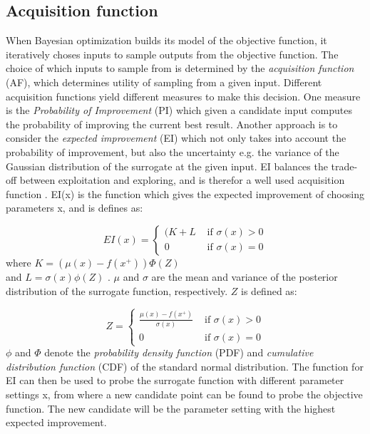 \subsection{Acquisition function}\label{sec:acquisition-function}
When Bayesian optimization builds its model of the objective function, it iteratively choses inputs to sample outputs from the objective function. The choice of which inputs to sample from is determined by the \emph{acquisition function} (AF), which determines utility of sampling from a given input. Different acquisition functions yield different measures to make this decision. One measure is the \emph{Probability of Improvement} (PI) which given a candidate input computes the probability of improving the current best result.  Another approach is to consider the \emph{expected improvement} (EI) which not only takes into account the probability of improvement, but also the uncertainty e.g. the variance of the Gaussian distribution of the surrogate at the given input.
EI balances the trade-off between exploitation and exploring, and is therefor a well used acquisition function \citet{brochu2010tutorial}. EI(x) is the function which gives the expected improvement of choosing parameters x, and is defines as:

\begin{equation}
\label{eq:expected-improvement}
EI(x) =
\begin{cases}
   (K + L & \text{ if } \sigma(x) > 0\\
   0 	  & \text{ if } \sigma(x) = 0
\end{cases}
\end{equation}
where $K = (\mu(x) - f(x^+))\Phi(Z)$ \\and $L = \sigma(x)\phi(Z)$ .
$\mu$ and $\sigma$ are the mean and variance of the posterior distribution of the surrogate function, respectively. $Z$ is defined as:

\begin{equation}
\label{eq:expect-z}
Z =
\begin{cases}
\frac{\mu(x) - f(x^+)}{\sigma(x)} & \text{ if } \sigma(x) > 0\\
0 								  & \text{ if } \sigma(x) = 0
\end{cases}
\end{equation}
$\phi$ and $\Phi$ denote the \emph{probability density function} (PDF) and \emph{cumulative distribution function} (CDF) of the standard normal distribution.
The function for EI can then be used to probe the surrogate function with different parameter settings x, from where a new candidate point can be found to probe the objective function. The new candidate will be the parameter setting with the highest expected improvement.  


